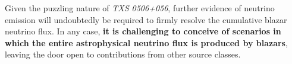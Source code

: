 %


Given the puzzling nature of \emph{TXS 0506+056}, further evidence of neutrino emission will undoubtedly be required to firmly resolve the cumulative blazar neutrino flux. In any case, \textbf{it is challenging to conceive of scenarios in which the entire astrophysical neutrino flux is produced by blazars}, leaving the door open to contributions from other source classes.

